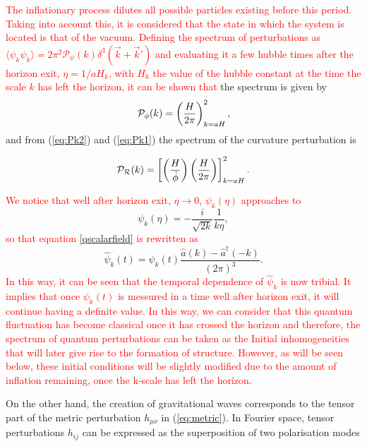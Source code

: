 \documentclass{rmaa}
\def\beq{\begin{equation}}
\def\eeq{\end{equation}}
\def\cal{\mathcal}
\begin{document}
\textcolor{red}{The inflationary process dilutes all possible particles existing before this period. 
Taking into account this, it is considered that the state in which the system is located is that of the vacuum. 
Defining the spectrum of perturbations as 
$\langle\psi_k\psi_k\rangle =2\pi^2 \mathcal{P}_\psi\left(k\right)\delta ^3\left(\vec{k}+\vec{k}'\right)$ 
and evaluating it a few hubble times after the horizon exit, $\eta=1/aH_k$, with $H_k$ the value of 
the hubble constant at the time the scale $k$ has left the horizon, it can be shown that} the spectrum is given by
%
\beq\label{eq:Pk2}
\cal P_{\phi}(k)=\left( {H \over 2\pi }\right)^2_{k=aH},
\eeq
%
and from (\ref{eq:Pk2}) and (\ref{eq:Pk1}) the spectrum of the curvature perturbation is 

\begin{equation}
\cal P_{\cal R}(k) = \left[ \left({H \over \dot \phi}\right) \left({H \over 2 \pi}\right)\right]^2_{k =
a H} .
\end{equation}

\textcolor{red}{We notice that well after horizon exit, $\eta \rightarrow 0$, $\psi_k\left(\eta\right)$ approaches to}
\begin{equation}
\psi_k\left(\eta\right)=-\frac{i}{\sqrt{2k}}\frac{1}{k\eta},
\end{equation}
\textcolor{red}{so that equation \ref{qscalarfield} is rewritten as}
\begin{equation}
\hat{\psi}_k\left(t\right)=\psi_k\left(t\right)\frac{\hat{a}\left(k\right)-\hat{a}^\dagger\left(-k\right)}{\left(2\pi\right)^3}.
\end{equation}
\textcolor{red}{In this way, it can be seen that the temporal dependence of $\hat{\psi}_k$ is now tribial. It implies that once $\psi_k\left(t\right)$ is messured in a time well after horizon exit, it will continue having a definite value. In this way, we can consider that  this quantum fluctuation has become classical once it has crossed the horizon and therefore, the spectrum of quantum perturbations can be taken as the Initial inhomogeneities that will later give rise to the formation of structure. However, as will be seen below, these initial conditions will be slightly modified due to the amount of inflation remaining, once the k-scale has left the horizon.}
 
On the other hand, the creation of gravitational waves corresponds to the tensor 
part of the metric perturbation $h_{\mu \nu}$ in (\ref{eq:metric}). In Fourier space, 
tensor perturbations $h_{ij}$ can be expressed as the superposition of two polarisation modes
\end{document}
